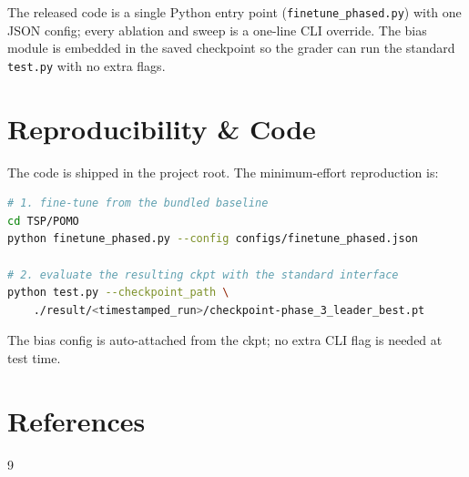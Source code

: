 \documentclass[11pt,a4paper]{article}
\begin{document}
The released code is a single Python entry point
(\texttt{finetune\_phased.py}) with one JSON config; every ablation and
sweep is a one-line CLI override. The bias module is embedded in the
saved checkpoint so the grader can run the standard \texttt{test.py} with
no extra flags.

\section*{Reproducibility \& Code}

The code is shipped in the project root. The minimum-effort reproduction
is:
\begin{lstlisting}[language=bash]
# 1. fine-tune from the bundled baseline
cd TSP/POMO
python finetune_phased.py --config configs/finetune_phased.json

# 2. evaluate the resulting ckpt with the standard interface
python test.py --checkpoint_path \
    ./result/<timestamped_run>/checkpoint-phase_3_leader_best.pt
\end{lstlisting}

The bias config is auto-attached from the ckpt; no extra CLI flag is
needed at test time.

\section*{References}
\begin{thebibliography}{9}
\bibitem{AM} %
\end{thebibliography}
\end{document}
